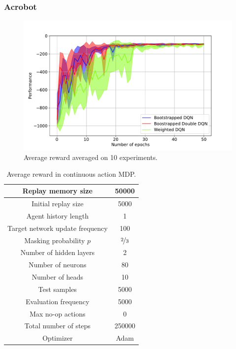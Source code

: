\subsubsection{Acrobot}
\begin{figure}[t]
  \centering
  \includegraphics[scale=.6]{./img/acrobot.pdf}
  \caption{Average reward averaged on 10 experiments.
  }
  \label{F:acrobot}
\end{figure}
\begin{table}[t]
 \centering
 \caption{Average reward in continuous action MDP.}
 \label{T:acrobot_pars}
\begin{small}
\setlength{\tabcolsep}{4pt}
 \begin{tabular}{|c|c|}
\hline
Replay memory size & 50000\\
\hline
Initial replay size & 5000\\
\hline
Agent history length & 1\\
\hline
Target network update frequency & 100\\
\hline
Masking probability $p$ & $\nicefrac{2}{3}$\\
\hline
Number of hidden layers & 2\\
\hline
Number of neurons & 80\\
\hline
Number of heads & 10\\
\hline
Test samples & 5000\\
\hline
Evaluation frequency & 5000\\
\hline
Max no-op actions & 0\\
\hline
Total number of steps & 250000\\
\hline
Optimizer & Adam\\
\hline
 \end{tabular}
 \end{small}
\end{table}

